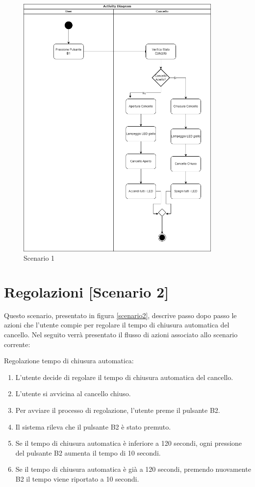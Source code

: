 \begin{figure}[H]
    \centering
    \includegraphics[width=0.9\textwidth]{figures/scenario1.drawio.png}
    \caption{Scenario 1}
    \label{scenario1}
\end{figure}


\section{Regolazioni [Scenario 2]}
Questo scenario, presentato in figura \ref{scenario2}, descrive passo dopo passo le azioni che l’utente compie per regolare il tempo di chiusura automatica del cancello. Nel seguito verrà presentato il flusso di azioni associato allo scenario corrente:

\noindent Regolazione tempo di chiusura automatica:

\begin{enumerate}
\item L’utente decide di regolare il tempo di chiusura automatica del cancello.
\item L’utente si avvicina al cancello chiuso.
\item Per avviare il processo di regolazione, l’utente preme il pulsante B2.
\item Il sistema rileva che il pulsante B2 è stato premuto.
\item Se il tempo di chiusura automatica è inferiore a 120 secondi, ogni pressione del pulsante B2 aumenta il tempo di 10 secondi.
\item Se il tempo di chiusura automatica è già a 120 secondi, premendo nuovamente B2 il tempo viene riportato a 10 secondi.
\end{enumerate}

